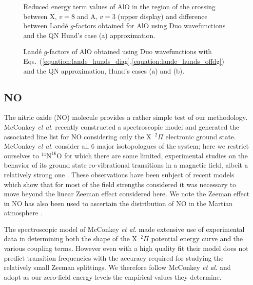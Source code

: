 \documentclass[preprint,review,12pt]{elsarticle}
\newcommand{\2}{$_{2}$}
\newcommand{\3}{$_{3}$}
\newcommand{\4}{$_{4}$}
\newcommand{\8}{$^{18}$}
\newcommand{\6}{$^{16}$}
\newcommand{\7}{$^{17}$}
\begin{document}
\begin{figure}[htbp]
		\centering
{}
\caption{Reduced energy term values of AlO in the region of  the crossing between X, $v=8$ and A, $v=3$ (upper
display)
and difference between Land\'e $g$-factors obtained for AlO using {\sc Duo} wavefunctions and the QN Hund's case
(a) approximation.}
\label{f:coupling}
\end{figure}




\begin{figure}[htbp]
		\centering
{}
\caption{Land\'e $g$-factors of AlO obtained using  {\sc Duo} wavefunctions with
Eqs.~(\ref{equation:lande_hunds_diag},\ref{equation:lande_hunds_offdg}) and the QN approximation, Hund's cases (a)
and (b). }
\label{f:AlO:Duo:a:b}
\end{figure}

\subsection{NO}

The nitric oxide (NO) molecule provides a rather simple test of our
methodology. McConkey  {\it et al.} \cite{jtNO} recently constructed
a spectroscopic model and generated the associated line list for NO
considering only the X~$^2\Pi$ electronic ground state. McConkey  {\it et al.}
consider all 6 major isotopologues of the system; here we restrict
ourselves to $\mathrm{^{14}N^{16}O}$ for which
there are some limited,
experimental studies on the behavior of its ground state ro-vibrational
transitions  in a magnetic field,
albeit a relatively strong one \cite{11IoKlKo.NO}. These observations
have been subject of recent models \cite{16BoSuKl.NO} which show
that for most of the field strengths considered it was necessary
to move beyond the linear Zeeman effect considered here. We note the
Zeeman effect in NO has also been used to ascertain the
distribution of NO in the Martian atmosphere \cite{08CoSaGe.NO}.

The spectroscopic model of  McConkey  {\it et al.} \cite{jtNO} made
extensive use of experimental data in determining both the shape of
the X~$^2\Pi$ potential energy curve and the various coupling terms.
However even with a high quality fit their model does
not predict transition frequencies with the accuracy required for
studying the relatively small Zeeman splittings. We therefore follow
McConkey  {\it et al.}  and adopt as our zero-field energy levels
the empirical values they determine.
\end{document}
